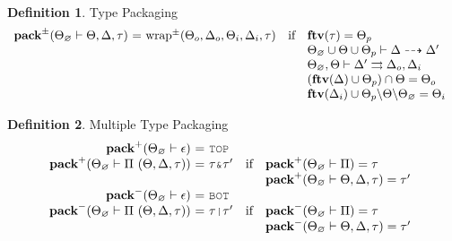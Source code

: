 \documentclass[acmsmall]{acmart}
\theoremstyle{definition}
\newtheorem{definition}{Definition}[section]
\begin{document}
\begin{definition}
  \label{def:type_packaging}
  Type Packaging 
  \hfill
  \\
  \[
  \begin{array}[t]{r@{}c@{}lcl}
      \textbf{pack}^\pm(\Theta_\ignore \entails \Theta, \Delta, \tau) 
      &\ =\ & 
      \text{wrap}^{\pm}(\Theta_o, \Delta_o, \Theta_i, \Delta_i, \tau)
      &\text{if}& 
      \begin{array}[t]{@{}l}
        \textbf{ftv}(\tau) = \Theta_p
        \\
        \Theta_\ignore \cup \Theta \cup \Theta_p \entails \Delta \dashrightarrow \Delta' 
        \\
        \Theta_\ignore, \Theta \entails \Delta' \rightrightarrows \Delta_o, \Delta_i 
        \\
        (\textbf{ftv}(\Delta) \cup \Theta_p) \cap \Theta = \Theta_o 
        \\
        \textbf{ftv}(\Delta_i) \cup \Theta_p \backslash \Theta \backslash \Theta_\ignore = \Theta_i 
      \end{array}
  \end{array}
  \]
\end{definition}


\begin{definition}
  \label{def:multiple_type_packaging}
  Multiple Type Packaging 
  \hfill
  \ 
  \\
  \[
  \begin{array}[t]{r@{}c@{}lcl}
      \textbf{pack}^+(\Theta_\ignore \entails \epsilon) 
      &\ =\ & 
      \J{TOP} 

      \\

      \textbf{pack}^+(\Theta_\ignore \entails \Pi\ (\Theta, \Delta, \tau)) 
      &\ =\ & 
      \tau \J{\&} \tau' 
      &\text{if}& 
      \begin{array}[t]{@{}l}
        \textbf{pack}^+(\Theta_\ignore \entails \Pi) = \tau 
        \\
        \textbf{pack}^+(\Theta_\ignore \entails \Theta, \Delta, \tau) = \tau'
      \end{array}

      \\

      \textbf{pack}^-(\Theta_\ignore \entails \epsilon) 
      &\ =\ & 
      \J{BOT} 

      \\

      \textbf{pack}^-(\Theta_\ignore \entails \Pi\ (\Theta, \Delta, \tau))
      &\ =\ & 
      \tau \J{|} \tau' 
      &\text{if}& 
      \begin{array}[t]{@{}l}
        \textbf{pack}^-(\Theta_\ignore \entails \Pi) = \tau 
        \\
        \textbf{pack}^-(\Theta_\ignore \entails \Theta, \Delta, \tau) = \tau'
      \end{array}
  \end{array}
  \]
\end{definition}
\end{document}
